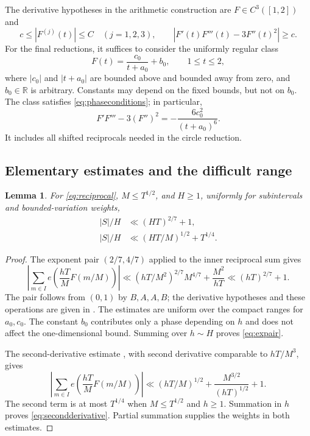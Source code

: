 \documentclass[11pt,reqno]{amsart}
\numberwithin{equation}{section}
\newtheorem{lemma}[lemma]{Lemma}
\theoremstyle{definition}
\theoremstyle{remark}
\newcommand{\R}{\mathbb R}
\begin{document}
The derivative hypotheses in the arithmetic construction are $F\in C^3([1,2])$ and
\begin{equation}\label{eq:phaseconditions}
 c\le|F^{(j)}(t)|\le C\quad(j=1,2,3),\qquad
 |F'(t)F'''(t)-3F''(t)^2|\ge c.
\end{equation}
For the final reductions, it suffices to consider the uniformly regular class
\begin{equation}\label{eq:reciprocal}
 F(t)=\frac{c_0}{t+a_0}+b_0,\qquad 1\le t\le2,
\end{equation}
where $|c_0|$ and $|t+a_0|$ are bounded above and bounded away from zero, and $b_0\in\R$ is arbitrary.
Constants may depend on the fixed bounds, but not on $b_0$.
The class satisfies \eqref{eq:phaseconditions}; in particular,
\[
 F'F'''-3(F'')^2=-\frac{6c_0^2}{(t+a_0)^6}.
\]
It includes all shifted reciprocals needed in the circle reduction.


\subsection{Elementary estimates and the difficult range}
\begin{lemma}\label{lem:elementary}
For \eqref{eq:reciprocal}, $M\le T^{1/2}$, and $H\ge1$, uniformly for subintervals and bounded-variation weights,
\begin{align}
 |S|/H&\ll(HT)^{2/7}+1,\label{eq:expair}\\
 |S|/H&\ll(HT/M)^{1/2}+T^{1/4}.\label{eq:secondderivative}
\end{align}
\end{lemma}
\begin{proof}
The exponent pair $(2/7,4/7)$ applied to the inner reciprocal sum gives
\[
 \left|\sum_{m\in I}e\left(\frac{hT}{M}F(m/M)\right)\right|
 \ll(hT/M^2)^{2/7}M^{4/7}+\frac{M^2}{hT}
 \ll(hT)^{2/7}+1.
\]
The pair follows from $(0,1)$ by $B,A,A,B$; the derivative hypotheses and these operations are given in \cite[Chapters~2--3]{GK}.
The estimates are uniform over the compact ranges for $a_0,c_0$.
The constant $b_0$ contributes only a phase depending on $h$ and does not affect the one-dimensional bound.
Summing over $h\sim H$ proves \eqref{eq:expair}.

The second-derivative estimate \cite[Theorem~2.2]{GK}, with second derivative comparable to $hT/M^3$, gives
\[
 \left|\sum_{m\in I}e\left(\frac{hT}{M}F(m/M)\right)\right|
 \ll(hT/M)^{1/2}+\frac{M^{3/2}}{(hT)^{1/2}}+1.
\]
The second term is at most $T^{1/4}$ when $M\le T^{1/2}$ and $h\ge1$.
Summation in $h$ proves \eqref{eq:secondderivative}.
Partial summation supplies the weights in both estimates.
\end{proof}
\end{document}
